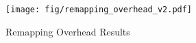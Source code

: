 \begin{figure}[t]
  \centering
  \texttt{[image: fig/remapping\_overhead\_v2.pdf]}
  \caption{Remapping Overhead Results}
  \label{fig:remapping_overhead}
\end{figure}